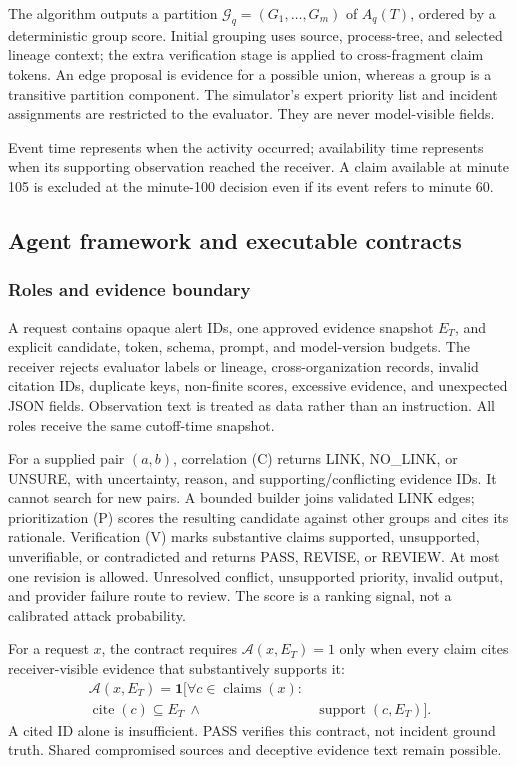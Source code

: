 \documentclass[pdflatex,sn-mathphys-num,iicol]{sn-jnl}
\begin{document}
The algorithm outputs a partition $\mathcal G_q=(G_1,\ldots,G_m)$ of $A_q(T)$, ordered by a deterministic group score. Initial grouping uses source, process-tree, and selected lineage context; the extra verification stage is applied to cross-fragment claim tokens. An edge proposal is evidence for a possible union, whereas a group is a transitive partition component. The simulator's expert priority list and incident assignments are restricted to the evaluator. They are never model-visible fields.



Event time represents when the activity occurred; availability time represents when its supporting observation reached the receiver. A claim available at minute 105 is excluded at the minute-100 decision even if its event refers to minute 60.



\subsection{Agent framework and executable contracts}\label{sec:agents}
\subsubsection{Roles and evidence boundary}
A request contains opaque alert IDs, one approved evidence snapshot $E_T$, and explicit candidate, token, schema, prompt, and model-version budgets. The receiver rejects evaluator labels or lineage, cross-organization records, invalid citation IDs, duplicate keys, non-finite scores, excessive evidence, and unexpected JSON fields. Observation text is treated as data rather than an instruction. All roles receive the same cutoff-time snapshot.

For a supplied pair $(a,b)$, correlation (C) returns LINK, NO\_LINK, or UNSURE, with uncertainty, reason, and supporting/conflicting evidence IDs. It cannot search for new pairs. A bounded builder joins validated LINK edges; prioritization (P) scores the resulting candidate against other groups and cites its rationale. Verification (V) marks substantive claims supported, unsupported, unverifiable, or contradicted and returns PASS, REVISE, or REVIEW. At most one revision is allowed. Unresolved conflict, unsupported priority, invalid output, and provider failure route to review. The score is a ranking signal, not a calibrated attack probability.

For a request $x$, the contract requires $\mathcal A(x,E_T)=1$ only when every claim cites receiver-visible evidence that substantively supports it:
\begin{equation}\label{eq:citationgate}
\begin{aligned}
\mathcal A(x,E_T)=\mathbf1\bigl[\forall c\in\operatorname{claims}(x):{}&\\
\operatorname{cite}(c)\subseteq E_T\ \land\ {}&\operatorname{support}(c,E_T)\bigr].
\end{aligned}
\end{equation}
A cited ID alone is insufficient. PASS verifies this contract, not incident ground truth. Shared compromised sources and deceptive evidence text remain possible.
\end{document}
